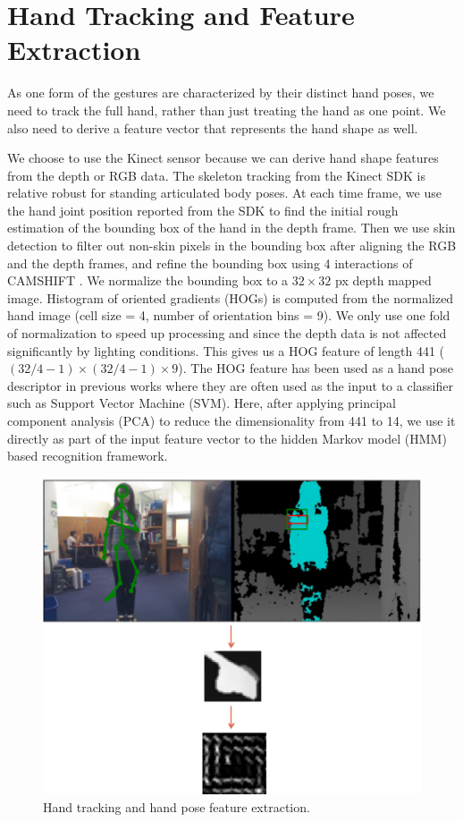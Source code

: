 \documentclass[conference]{IEEEtran}
\begin{document}
\section{Hand Tracking and Feature Extraction}
As one form of the gestures are characterized by their distinct hand poses, we
need to track the full hand, rather than just treating the hand as one point. We
also need to derive a feature vector that represents the hand shape as well.

We choose to use the Kinect sensor because we can derive hand shape features
from the depth or RGB data. The skeleton tracking from the Kinect SDK is
relative robust for standing articulated body poses. At each time frame, we use
the hand joint position reported from the SDK to find the initial rough estimation of the
bounding box of the hand in the depth frame. Then we use skin detection to
filter out non-skin pixels in the bounding box after aligning the RGB and the
depth frames, and refine the bounding box using 4 interactions of CAMSHIFT
\cite{bradski98}. We normalize the bounding box to a $32\times 32$ px depth
mapped image. Histogram of oriented gradients (HOGs) \cite{dalal05} is computed from
the normalized hand image (cell size = 4, number of orientation bins = 9). We
only use one fold of normalization to speed up processing and since the depth
data is not affected significantly by lighting conditions. This gives us a
HOG feature of length 441 ($(32/4 - 1)\times (32/4 - 1)\times 9$). The HOG
feature has been used as a hand pose descriptor in previous works \cite{song12} where they are often used as the input to a classifier such as Support Vector Machine
(SVM). Here, after applying principal component analysis (PCA) to reduce the
dimensionality from 441 to 14, we use it directly as part of the input feature
vector to the hidden Markov model (HMM) based recognition framework.

\begin{figure}[!t]
\centering
\includegraphics[width=\columnwidth]{fig/hand_tracking.ps}
\caption{Hand tracking and hand pose feature extraction.}
\label{fig:tracking}
\end{figure}
\end{document}
